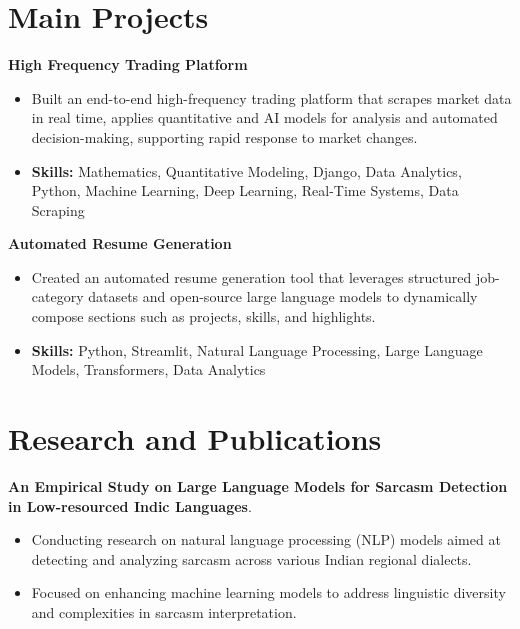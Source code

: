 \documentclass[a4paper,11pt]{article}
\begin{document}
\section{\textbf{Main Projects}}

\vspace{1mm}
  \textbf{High Frequency Trading Platform  }
\vspace{-1.5mm} %
\begin{itemize}
  \item Built an end-to-end high-frequency trading platform that scrapes market data in real time, applies quantitative and AI models for analysis and automated decision-making, supporting rapid response to market changes.
\vspace{-3mm}
  \item \textbf{Skills:} Mathematics, Quantitative Modeling, Django, Data Analytics, Python, Machine Learning, Deep Learning, Real-Time Systems, Data Scraping
\end{itemize}


\vspace{1mm}
   \textbf{Automated Resume Generation }
\vspace{-1.5mm} %
\begin{itemize}
  \item Created an automated resume generation tool that leverages structured job-category datasets and open-source large language models to dynamically compose sections such as projects, skills, and highlights.
\vspace{-3mm}
  \item \textbf{Skills:} Python, Streamlit, Natural Language Processing, Large Language Models, Transformers, Data Analytics
\end{itemize}



\section{\textbf{Research and Publications} \hfill }
\vspace{1mm}
  \textbf{An Empirical Study on Large Language Models for Sarcasm Detection in Low-resourced Indic Languages}.
\vspace{-1mm} %
\begin{itemize}
  \item Conducting research on natural language processing (NLP) models aimed at detecting and analyzing sarcasm across various Indian regional dialects.
\vspace{-3mm}
  \item Focused on enhancing machine learning models to address linguistic diversity and complexities in sarcasm interpretation.
\end{itemize}
\end{document}
